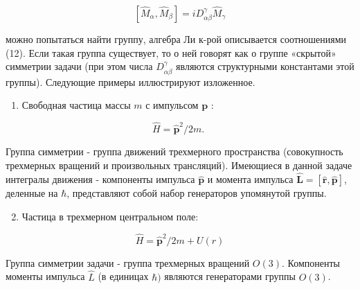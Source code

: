 \documentclass[10pt]{article}
\begin{document}
\[

\left[\hat{M}_{\alpha}, \hat{M}_{\beta}\right]=i D_{\alpha \beta}^{\gamma} \hat{M}_{\gamma}

\]



можно попытаться найти группу, алгебра Ли к-рой описывается соотношениями (12). Если такая группа существует, то о ней говорят как о группе «скрытой» симметрии задачи (при этом числа $D_{\alpha \beta}^{\gamma}$ являются структурными константами этой группы). Следующие примеры иллюстрируют изложенное.



\begin{enumerate}

  \item Свободная частица массы $m$ с импульсом $\boldsymbol{p}$ :

\end{enumerate}



\[

\hat{H}=\hat{\boldsymbol{p}}^{2} / 2 m \text {. }

\]



Группа симметрии - группа движений трехмерного пространства (совокупность трехмерных вращений и произвольных трансляций). Имеющиеся в данной задаче интегралы движения - компоненты импульса $\hat{\boldsymbol{p}}$ и момента импульса $\hat{\boldsymbol{L}}=[\hat{\boldsymbol{r}}, \hat{\boldsymbol{p}}]$, деленные на $\hbar$, представляют собой набор генераторов упомянутой группы.



\begin{enumerate}

  \setcounter{enumi}{1}

  \item Частица в трехмерном центральном поле:

\end{enumerate}



\[

\hat{H}=\hat{\boldsymbol{p}}^{2} / 2 m+U(r)

\]



Группа симметрии задачи - группа трехмерных вращений $O(3)$. Компоненты моменты импульса $\hat{L}$ (в единицах $\hbar)$ являются генераторами группы $O(3)$.
\end{document}
